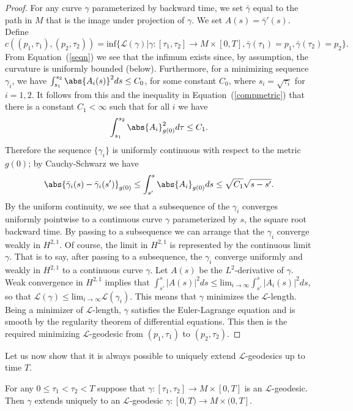 \begin{proof} For any curve $\gamma$ parameterized by backward time, we set
$\bar \gamma$ equal to the path in $M$ that is the image under
projection of $\gamma$. We set $A(s)=\bar\gamma'(s)$. Define
$$c((p_1,\tau_1),(p_2,\tau_{2})) = \mathrm{inf}
\{\mathcal{L}(\gamma)|\gamma\colon [\tau_{1},\tau_{2}] \rightarrow
M\times [0,T], \bar\gamma(\tau_{1}) = p_1, \bar\gamma(\tau_{2})=
p_2\}.$$ From Equation~(\ref{seqn}) we see that the infimum exists
since, by assumption, the curvature is uniformly bounded (below).
Furthermore, for a minimizing sequence $\gamma_{i}$, we have
$\int_{s_1}^{s_{2}}\abs{A_i(s)}^{2}ds \leq C_0$, for some constant
$C_0$, where $s_i=\sqrt{\tau_i}$ for $i=1,2$. It follows from this
and the inequality in Equation~(\ref{compmetric}) that there is a
constant $C_1<\infty$ such that for all $i$ we have
$$\int_{s_{1}}^{s_{2}} \abs{
A_{i}}^{2}_{g(0)}d\tau \leq C_1.$$ Therefore the sequence $\{\gamma_{i}\}$ is
uniformly continuous with respect to the metric $g(0)$; by Cauchy-Schwarz we
have
$$\abs{\bar\gamma_{i}(s) - \bar\gamma_{i}(s')}_{g(0)} \leq
\int_{s'}^{s} \abs{A_{i}}_{g(0)}ds \leq \sqrt{C_1}\sqrt{s-s'}.$$ By
the uniform continuity, we see that a subsequence of the $\gamma_i$
converges uniformly pointwise to a continuous curve $\gamma$
parameterized by $s$, the square root backward time. By passing to a
subsequence we can arrange that the $\gamma_i$ converge weakly in
$H^{2,1}$. Of course, the limit in $H^{2,1}$ is represented by the
continuous limit $\gamma$. That is to say, after passing to a
subsequence, the $\gamma_i$ converge uniformly and weakly in
$H^{2,1}$ to a continuous curve $\gamma$. Let $A(s)$ be the
$L^2$-derivative of $\gamma$. Weak convergence in $H^{2,1}$ implies
that $\int_{s'}^s|A(s)|^2ds\le \mathrm{lim}_{i\rightarrow\infty}\int_{s'}^s|A_i(s)|^2ds$, so that
${\mathcal L}(\gamma)\le \mathrm{lim}_{i\rightarrow\infty}{\mathcal
L}(\gamma_i)$. This means that $\gamma$ minimizes the ${\mathcal
L}$-length. Being a minimizer of ${\mathcal L}$-length, $\gamma$
satisfies the Euler-Lagrange equation and is smooth by the
regularity theorem of differential equations. This then is the
required minimizing ${\mathcal L}$-geodesic from $(p_1,\tau_1)$ to
$(p_2,\tau_2)$.
\end{proof}


Let us now show that it is always possible to uniquely extend
${\mathcal L}$-geodesics up to time $T$.

\begin{lemma}
\label{lem:l-geodesic-extension}
 For any $0\le \tau_1<\tau_2<T$ suppose that
 $\gamma\colon [\tau_1,\tau_2]\to M\times [0,T]$ is an ${\mathcal L}$-geodesic.
 Then $\gamma$ extends uniquely to an ${\mathcal L}$-geodesic
$\gamma\colon [0,T)\to M\times (0,T]$.
\end{lemma}



